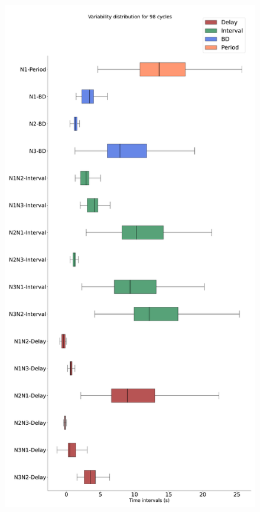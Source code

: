 \begin{figure}[htbp]
\begin{minipage}{0.9\textwidth}
\begin{minipage}[b]{0.45\textwidth}
			\includegraphics[width=\textwidth]{./invariants/data/SUSSEX/prep2/images/spontaneous_boxplot.pdf}
		\end{minipage}
		\begin{minipage}[b]{0.53\textwidth}
			\centering

\end{minipage}
\end{minipage}
\end{figure}
